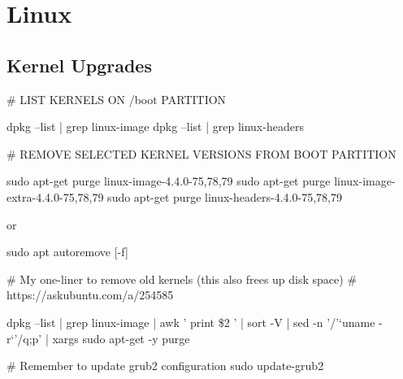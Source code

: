 
\chapter{Linux}

\section{Kernel Upgrades}

\begin{txt}
    # LIST KERNELS ON /boot PARTITION
    
    dpkg --list | grep linux-image
    dpkg --list | grep linux-headers
\end{txt}

\begin{txt}    
    # REMOVE SELECTED KERNEL VERSIONS FROM BOOT PARTITION
    
    sudo apt-get purge linux-image-4.4.0-{75,78,79}
    sudo apt-get purge linux-image-extra-4.4.0-{75,78,79}
    sudo apt-get purge linux-headers-4.4.0-{75,78,79}
    
    or
    
    sudo apt autoremove [-f]
\end{txt}
    
\begin{txt}
    # My one-liner to remove old kernels (this also frees up disk space)
    # https://askubuntu.com/a/254585
    
    dpkg --list | grep linux-image | awk '{ print \$2 }' | sort -V | sed -n '/'`uname -r`'/q;p' | xargs sudo apt-get -y purge
\end{txt}
    
\begin{txt}    
    # Remember to update grub2 configuration
    sudo update-grub2
\end{txt}